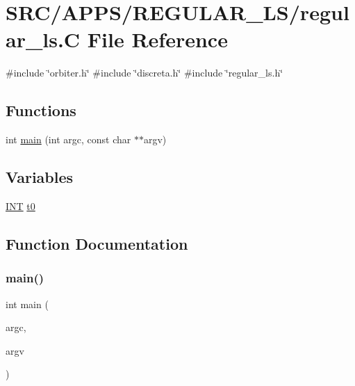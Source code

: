 \hypertarget{regular__ls_8_c}{}\section{S\+R\+C/\+A\+P\+P\+S/\+R\+E\+G\+U\+L\+A\+R\+\_\+\+L\+S/regular\+\_\+ls.C File Reference}
\label{regular__ls_8_c}
{\ttfamily \#include \char`\"{}orbiter.\+h\char`\"{}}\newline
{\ttfamily \#include \char`\"{}discreta.\+h\char`\"{}}\newline
{\ttfamily \#include \char`\"{}regular\+\_\+ls.\+h\char`\"{}}\newline
\subsection*{Functions}
\begin{DoxyCompactItemize}
\item 
int \mbox{\hyperlink{regular__ls_8_c_a217dbf8b442f20279ea00b898af96f52}{main}} (int argc, const char $\ast$$\ast$argv)
\end{DoxyCompactItemize}
\subsection*{Variables}
\begin{DoxyCompactItemize}
\item 
\mbox{\hyperlink{galois_8h_a09fddde158a3a20bd2dcadb609de11dc}{I\+NT}} \mbox{\hyperlink{regular__ls_8_c_a4268f4fe222ffb119218a0199f5e1904}{t0}}
\end{DoxyCompactItemize}


\subsection{Function Documentation}
\mbox{\label{regular__ls_8_c_a217dbf8b442f20279ea00b898af96f52}} 
\subsubsection{\texorpdfstring{main()}{main()}}
{\footnotesize\ttfamily int main (\begin{DoxyParamCaption}\item[{int}]{argc,  }\item[{const char $\ast$$\ast$}]{argv }\end{DoxyParamCaption})}




